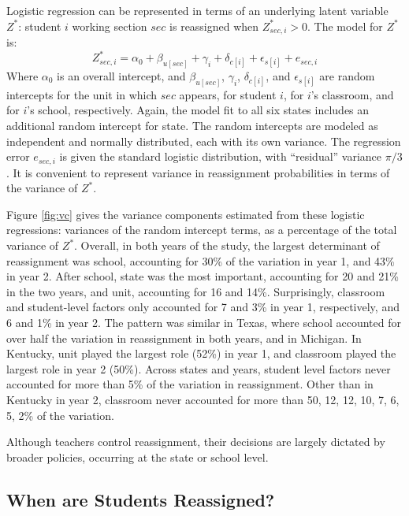 \documentclass[12pt]{article}\usepackage[]{graphicx}\usepackage[]{color}
\begin{document}
Logistic regression can be represented in terms of an underlying
latent variable $Z^*$: student $i$ working section $sec$ is reassigned
when $Z_{sec,i}^*>0$.
The model for $Z^*$ is:
\begin{equation*}
 Z^*_{sec,i}=\alpha_0+\beta_{u[sec]}+\gamma_i+\delta_{c[i]}+\epsilon_{s[i]}+e_{sec,i}
\end{equation*}
Where $\alpha_0$ is an overall intercept,
and $\beta_{u[sec]}$, $\gamma_i$, $\delta_{c[i]}$, and $\epsilon_{s[i]}$
are random intercepts for the unit in which $sec$ appears, for student
$i$, for $i$'s classroom, and for $i$'s school, respectively.
Again, the model fit to all six states includes an additional random
intercept for state.
The random intercepts are modeled as independent and normally
distributed, each with its own variance.
The regression error $e_{sec,i}$ is given the standard logistic
distribution, with ``residual'' variance $\pi/3$.
It is convenient to represent variance in reassignment probabilities
in terms of the variance of $Z^*$.

Figure \ref{fig:vc} gives the variance components estimated from these
logistic regressions: variances of the random intercept terms, as a
percentage of the total variance of $Z^*$.
Overall, in both years of the study, the largest determinant of
reassignment was school, accounting for
30\% of the variation in year 1,
and 43\% in year 2.
After school, state was the most important, accounting for
20 and
21\% in the two years, and unit,
accounting for 16 and 14\%.
Surprisingly, classroom and student-level factors only accounted for
7 and
3\% in year 1, respectively,
and 6 and
1\% in year 2.
The pattern was similar in Texas, where school accounted for over half
the variation in reassignment in both years, and in Michigan.
In Kentucky, unit played the largest role
(52\%) in year 1, and classroom played
the largest role in year 2 (50\%).
Across states and years, student level factors never accounted for
more than 5\% of
the variation in reassignment.
Other than in Kentucky in year 2, classroom never accounted for more
than 50, 12, 12, 10, 7, 6, 5, 2\%  of
the variation.

Although teachers control reassignment, their decisions are largely
dictated by broader policies, occurring at the state or school level.


\subsection{When are Students Reassigned?}
\end{document}
